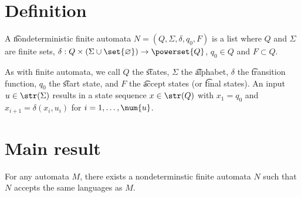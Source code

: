 
\section*{Definition}

A \t{nondeterministic finite automata} $N = (Q, \Sigma , \delta , q_0, F)$ is a list where $Q$ and $\Sigma $ are finite sets, $\delta : Q \times (\Sigma  \cup \set{\varnothing}) \to \powerset{Q}$, $q_0 \in Q$ and $F \subset Q$.

As with finite automata, we call $Q$ the \t{states}, $\Sigma $ the \t{alphabet}, $\delta $ the \t{transition function}, $q_0$ the \t{start state}, and $F$ the \t{accept states} (or \t{final states}).
An input $u \in \str(\Sigma )$ results in a state sequence $x \in \str(Q)$ with $x_1 = q_0$ and $x_{i+1} = \delta (x_i, u_i)$ for $i = 1, \dots , \num{u}$.

\section*{Main result}

For any automata $M$, there exists a nondeterminstic finite automata $N$ such that $N$ accepts the same languages as $M$.

\blankpage